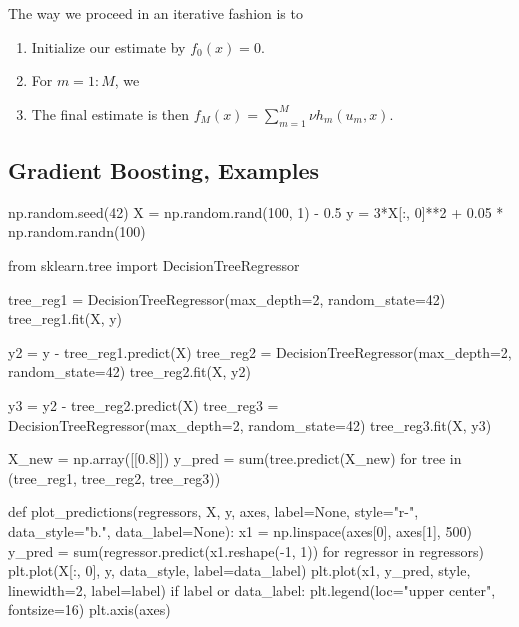 \documentclass[%
oneside,                 %
final,                   %
10pt]{article}
\begin{document}
The way we proceed in an iterative fashion is to
\begin{enumerate}
\item Initialize our estimate by $f_0(x)=0$.

\item For $m=1:M$, we

\noindent
\item The final estimate is then $f_M(x) = \sum_{m=1}^M\nu h_m(u_m,x)$.
\end{enumerate}

\noindent
\subsection{Gradient Boosting, Examples}
\bpycod
np.random.seed(42)
X = np.random.rand(100, 1) - 0.5
y = 3*X[:, 0]**2 + 0.05 * np.random.randn(100)

from sklearn.tree import DecisionTreeRegressor

tree_reg1 = DecisionTreeRegressor(max_depth=2, random_state=42)
tree_reg1.fit(X, y)

y2 = y - tree_reg1.predict(X)
tree_reg2 = DecisionTreeRegressor(max_depth=2, random_state=42)
tree_reg2.fit(X, y2)

y3 = y2 - tree_reg2.predict(X)
tree_reg3 = DecisionTreeRegressor(max_depth=2, random_state=42)
tree_reg3.fit(X, y3)

X_new = np.array([[0.8]])
y_pred = sum(tree.predict(X_new) for tree in (tree_reg1, tree_reg2, tree_reg3))

def plot_predictions(regressors, X, y, axes, label=None, style="r-", data_style="b.", data_label=None):
    x1 = np.linspace(axes[0], axes[1], 500)
    y_pred = sum(regressor.predict(x1.reshape(-1, 1)) for regressor in regressors)
    plt.plot(X[:, 0], y, data_style, label=data_label)
    plt.plot(x1, y_pred, style, linewidth=2, label=label)
    if label or data_label:
        plt.legend(loc="upper center", fontsize=16)
    plt.axis(axes)
\end{document}
